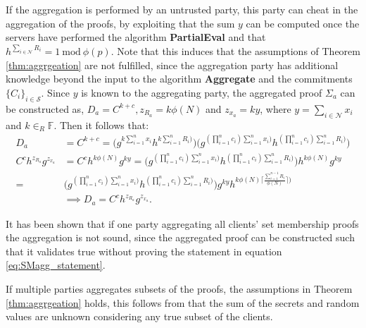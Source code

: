 If the aggregation is performed by an untrusted party, this party can cheat in the aggregation of the proofs, by exploiting that the sum $y$ can be computed once the servers have performed the algorithm \textbf{PartialEval} and that  $h^{\sum_{i\in\mathcal{N}} R_i } =1 \: \text{mod}\:  \phi(p)$. Note that this induces that  the assumptions of Theorem \ref{thm:aggrgeation} are not fulfilled, since the aggregation party has additional knowledge beyond the input to the algorithm \textbf{Aggregate} and the commitments $\{C_i\}_{i\in\mathcal{S}}$. %
Since $y$ is known to the aggregating party, the aggregated proof $\Sigma_a$ can be constructed as, $D_a=C^{k+c}, z_{R_a} = k\phi (N)$ and $z_{x_a} = k y$, where $y= \sum_{i\in\mathcal{N}} x_i$ and $k\in_R \mathds{F}$. Then it follows that:
\begin{align*}
D_a &= C^{k+c}= \big( g^ { k \sum_{i=1}^n x_i } h^{ k  \sum_{i=1}^n R_i ) } \big)   \big( g^{ (  \prod_{i=1}^n c_i ) \sum_{i=1}^n x_i ) } h^{ ( \prod_{i=1}^n c_i ) \sum_{i=1}^n R_i ) } \big)   \\
 C^c h^{z_{R_a}}g^{z_{x_a}} &= C^c h^{k \phi (N) } g^{k y} =  \big( g^{ (  \prod_{i=1}^n c_i ) \sum_{i=1}^n x_i ) } h^{ ( \prod_{i=1}^n c_i ) \sum_{i=1}^n R_i ) } \big) h^{k\phi (N)} g^{ky}\\
= &  \big( g^{ (  \prod_{i=1}^n c_i ) \sum_{i=1}^n x_i ) } h^{ ( \prod_{i=1}^n c_i ) \sum_{i=1}^n R_i ) } \big)g^ { k y} h^{ k  \phi(N)\lceil \frac{\sum_{i=1}^{n-1}R_i}{\phi(N)}\rceil ) }\\
& \implies D_a = C^ch^{z_{R_a}}g^{z_{x_a}}.
\end{align*}

It has been shown that if one party aggregating all clients' set membership proofs the aggregation is not sound, since the aggregated proof can be constructed such that it validates true without proving the statement in equation \ref{eq:SMagg_statement}. 

If multiple parties aggregates subsets of the proofs, the assumptions in Theorem \ref{thm:aggrgeation} holds,  this follows from that the sum of the secrets and random values are unknown considering any true subset of the clients. 

